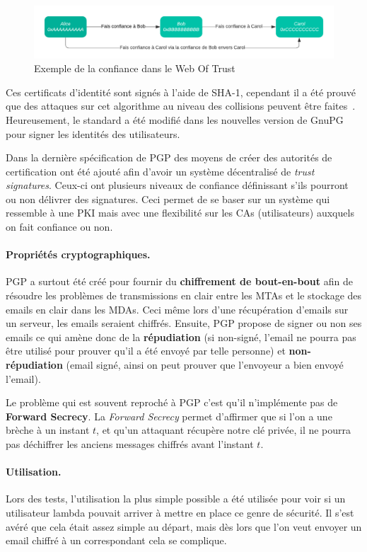 \begin{figure}[h!]
	\includegraphics[width=\textwidth]{images/WOTExemple.pdf}
	\centering
	\caption{Exemple de la confiance dans le Web Of Trust}
	\label{fig:WOTExample}
\end{figure}

Ces certificats d'identité sont signés à l'aide de SHA-1, cependant il a été prouvé que des attaques sur cet algorithme au niveau des collisions peuvent être faites~\cite{journals/iacr/LeurentP20}. Heureusement, le standard a été modifié dans les nouvelles version de GnuPG pour signer les identités des utilisateurs.

Dans la dernière spécification de PGP des moyens de créer des autorités de certification ont été ajouté afin d'avoir un système décentralisé de \textit{trust signatures}. Ceux-ci ont plusieurs niveaux de confiance définissant s'ils pourront ou non délivrer des signatures. Ceci permet de se baser sur un système qui ressemble à une PKI mais avec une flexibilité sur les CAs (utilisateurs) auxquels on fait confiance ou non.
\paragraph*{Propriétés cryptographiques.}
PGP a surtout été créé pour fournir du \textbf{chiffrement de bout-en-bout} afin de résoudre les problèmes de transmissions en clair entre les MTAs et le stockage des emails en clair dans les MDAs. Ceci même lors d'une récupération d'emails sur un serveur, les emails seraient chiffrés. Ensuite, PGP propose de signer ou non ses emails ce qui amène donc de la \textbf{répudiation} (si non-signé, l'email ne pourra pas être utilisé pour prouver qu'il a été envoyé par telle personne) et \textbf{non-répudiation} (email signé, ainsi on peut prouver que l'envoyeur a bien envoyé l'email).

Le problème qui est souvent reproché à PGP c'est qu'il n'implémente pas de \textbf{Forward Secrecy}. La \textit{Forward Secrecy} permet d'affirmer que si l'on a une brèche à un instant $t$, et qu'un attaquant récupère notre clé privée, il ne pourra pas déchiffrer les anciens messages chiffrés avant l'instant $t$.
\paragraph*{Utilisation.}
Lors des tests, l’utilisation la plus simple possible a été utilisée pour voir si un utilisateur lambda pouvait arriver à mettre en place ce genre de sécurité. Il s’est avéré que cela était assez simple au départ, mais dès lors que l'on veut envoyer un email chiffré à un correspondant cela se complique.

